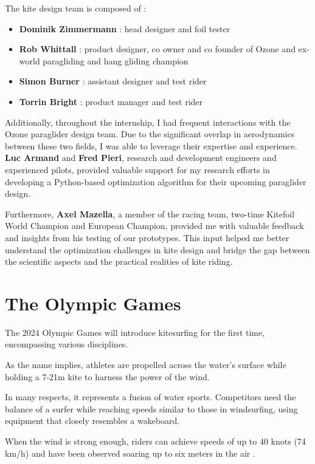 The kite design team is composed of :
\begin{itemize}
    \item \textbf{Dominik Zimmermann} : head designer and foil tester
    \item \textbf{Rob Whittall} : product designer, co owner and co founder of Ozone and ex-world paragliding and hang gliding champion
    \item \textbf{Simon Burner} : assistant designer and test rider
    \item \textbf{Torrin Bright} : product manager and test rider
\end{itemize}

Additionally, throughout the internship, I had frequent interactions with the Ozone paraglider design team. Due to the significant overlap in aerodynamics between these two fields, I was able to leverage their expertise and experience. \textbf{Luc Armand} and \textbf{Fred Pieri}, research and development engineers and experienced pilots, provided valuable support for my research efforts in developing a Python-based optimization algorithm for their upcoming paraglider design.

Furthermore, \textbf{Axel Mazella}, a member of the racing team, two-time Kitefoil World Champion and European Champion, provided me with valuable feedback and insights from his testing of our prototypes. This input helped me better understand the optimization challenges in kite design and bridge the gap between the scientific aspects and the practical realities of kite riding.


\section{The Olympic Games}
\label{sec:In1.3}

The 2024 Olympic Games will introduce kitesurfing for the first time, encompassing various disciplines.

As the name implies, athletes are propelled across the water's surface while holding a 7-21m kite to harness the power of the wind.

In many respects, it represents a fusion of water sports. Competitors need the balance of a surfer while reaching speeds similar to those in windsurfing, using equipment that closely resembles a wakeboard.

When the wind is strong enough, riders can achieve speeds of up to 40 knots (74 km/h) and have been observed soaring up to six meters in the air \cite{olympics}.

